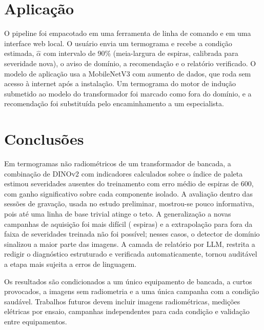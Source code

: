 \documentclass[11pt,a4paper]{article}
\begin{document}
\section{Aplicação}
O pipeline foi empacotado em uma ferramenta de linha de comando e em uma interface web local. O usuário envia um termograma e recebe a condição estimada, $\hat\alpha$ com intervalo de 90\% (meia-largura de \AppMeia{} espiras, calibrada para severidade nova), o aviso de domínio, a recomendação e o relatório verificado. O modelo de aplicação usa a MobileNetV3 com aumento de dados, que roda sem acesso à internet após a instalação. Um termograma do motor de indução submetido ao modelo do transformador foi marcado como fora do domínio, e a recomendação foi substituída pelo encaminhamento a um especialista.

\section{Conclusões}
Em termogramas não radiométricos de um transformador de bancada, a combinação de DINOv2 com indicadores calculados sobre o índice de paleta estimou severidades ausentes do treinamento com erro médio de \InterpHib{} espiras de 600, com ganho significativo sobre cada componente isolado. A avaliação dentro das sessões de gravação, usada no estudo preliminar, mostrou-se pouco informativa, pois até uma linha de base trivial atinge o teto. A generalização a novas campanhas de aquisição foi mais difícil (\CampHib{} espiras) e a extrapolação para fora da faixa de severidades treinada não foi possível; nesses casos, o detector de domínio sinalizou a maior parte das imagens. A camada de relatório por LLM, restrita a redigir o diagnóstico estruturado e verificada automaticamente, tornou auditável a etapa mais sujeita a erros de linguagem.

Os resultados são condicionados a um único equipamento de bancada, a curtos provocados, a imagens sem radiometria e a uma única campanha com a condição saudável. Trabalhos futuros devem incluir imagens radiométricas, medições elétricas por ensaio, campanhas independentes para cada condição e validação entre equipamentos.



\end{document}
